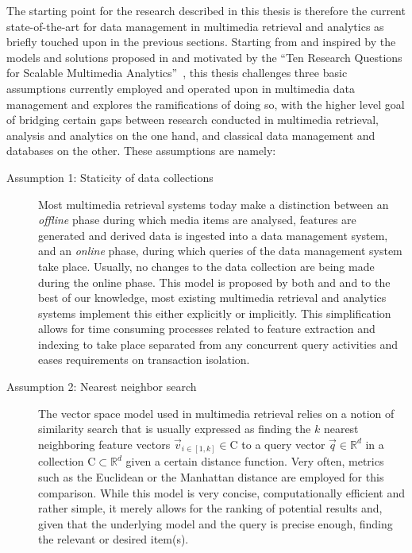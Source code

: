 The starting point for the research described in this thesis is therefore the current state-of-the-art for data management in multimedia retrieval and analytics as briefly touched upon in the previous sections. Starting from and inspired by the models and solutions proposed in \cite{Giangreco:2016adam,Giangreco:2018thesis} and motivated by the ``Ten Research Questions for Scalable Multimedia Analytics''~\cite{Jonson:2016}, this thesis challenges three basic assumptions currently employed and operated upon in multimedia data management and explores the ramifications of doing so, with the higher level goal of bridging certain gaps between research conducted in multimedia retrieval, analysis and analytics on the one hand, and classical data management and databases on the other. These assumptions are namely:

\begin{description}
    \item[Assumption 1: Staticity of data collections] Most multimedia retrieval systems today make a distinction between an \emph{offline} phase during which media items are analysed, features are generated and derived data is ingested into a data management system, and an \emph{online} phase, during which queries of the data management system take place. Usually, no changes to the data collection are being made during the online phase. This model is proposed by both \cite{Giangreco:2018thesis} and \cite{Rossetto:2018thesis} and to the best of our knowledge, most existing multimedia retrieval and analytics systems implement this either explicitly or implicitly. This simplification allows for time consuming processes related to feature extraction and indexing to take place separated from any concurrent query activities and eases requirements on transaction isolation. 

    \item[Assumption 2: Nearest neighbor search] The vector space model used in multimedia retrieval relies on a notion of similarity search that is usually expressed as finding the $k$ nearest neighboring feature vectors $\vec{v}_{i \in \left[1,k\right]} \in \mathrm{C}$ to a query vector $\vec{q} \in \mathbb{R}^d$ in a collection $\mathrm{C} \subset \mathbb{R}^d$ given a certain distance function. Very often, metrics such as the Euclidean or the Manhattan distance are employed for this comparison. While this model is very concise, computationally efficient and rather simple, it merely allows for the ranking of potential results and, given that the underlying model and the query is precise enough, finding the relevant or desired item(s).


\end{description}
